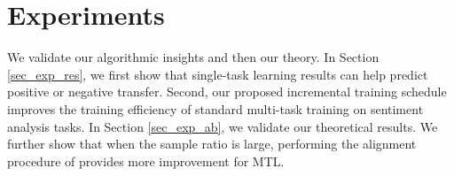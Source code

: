 \section{Experiments}

We validate our  algorithmic insights and then our theory.
In Section \ref{sec_exp_res}, we first show that single-task learning results can help predict positive or negative transfer.
Second, our proposed incremental training schedule improves the training efficiency of standard multi-task training on sentiment analysis tasks.
In Section \ref{sec_exp_ab}, we validate our theoretical results.
We further show that when the sample ratio is large, performing the alignment procedure of \cite{WZR20} provides more improvement for MTL.

